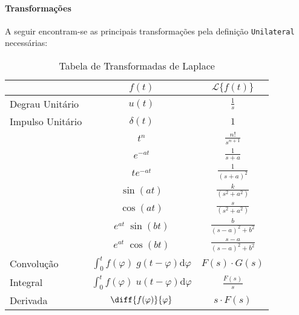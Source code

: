 \documentclass{article}
\begin{document}
            \paragraph{Transformações}A seguir encontram-se as principais transformações pela definição \texttt{Unilateral} necessárias:

                \begin{table}[H]
                    \centering
                    \begingroup
                    \renewcommand{\arraystretch}{1.25}
                    \begin{tabular}[]{lcc}
                                            & $f(t)$      & $\mathcal{L}\{ f(t) \}$\\\hline
                        Degrau Unitário  & $u(t)$      & $\frac{1}{s}$\\
                        Impulso Unitário & $\delta(t)$ & $1$\\
                                            & $t^{n}$     & $\frac{n!}{s^{n+1}}$\\
                                            & $e^{-at}$   & $\frac{1}{s+a}$\\
                                            & $te^{-at}$  & $\frac{1}{(s+a)^{2}}$\\
                                            & $\sin(at)$  & $\frac{k}{(s^2+a^2)}$\\
                                            & $\cos(at)$  & $\frac{s}{(s^2+a^2)}$\\
                                            & $e^{at}\;\sin(bt)$  & $\frac{b}{(s-a)^2+b^2}$\\
                                            & $e^{at}\;\cos(bt)$  & $\frac{s-a}{(s-a)^2+b^2}$\\
                        Convolução       & $\int_{0}^{t} f(\varphi)\;g(t - \varphi) \text{d}\varphi$ & $F(s)\cdot G(s)$\\
                        Integral         & $\int_{0}^{t} f(\varphi)\;u(t - \varphi) \text{d}\varphi$ & $\frac{F(s)}{s}$\\
                        Derivada         & $\diff{f(\varphi)}{\varphi} $ & $s\cdot F(s)$\\\hline
                    \end{tabular}
                    \endgroup
                    \caption{Tabela de Transformadas de Laplace}\label{table:Laplace}
                \end{table} \noindent
\end{document}
